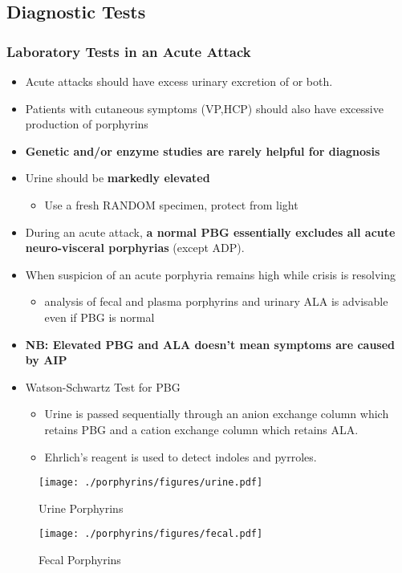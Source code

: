 \documentclass{scrartcl}
\begin{document}
\subsection{Diagnostic Tests}
\label{sec:orgac00301}
\subsubsection{Laboratory Tests in an Acute Attack}
\label{sec:org55f100f}
\begin{itemize}
\item Acute attacks should have excess urinary excretion of or both.
\item Patients with cutaneous symptoms (VP,HCP) should also have excessive
production of porphyrins
\item \textbf{Genetic and/or enzyme studies are rarely helpful for diagnosis}
\item Urine should be \textbf{markedly elevated}
\begin{itemize}
\item Use a fresh RANDOM specimen, protect from light
\end{itemize}
\item During an acute attack, \textbf{a normal PBG essentially excludes all acute
neuro-visceral porphyrias} (except ADP).
\item When suspicion of an acute porphyria remains high while crisis is
resolving
\begin{itemize}
\item analysis of fecal and plasma porphyrins and urinary ALA is
advisable even if PBG is normal
\end{itemize}
\item \textbf{NB: Elevated PBG and ALA doesn't mean symptoms are caused by AIP}
\item Watson-Schwartz Test for PBG
\begin{itemize}
\item Urine is passed sequentially through an anion exchange column which
retains PBG and a cation exchange column which retains ALA.
\item Ehrlich's reagent is used to detect indoles and pyrroles.
\end{itemize}
\end{itemize}

\begin{figure}[htbp]
\centering
\texttt{[image: ./porphyrins/figures/urine.pdf]}
\caption{\label{fig:org61811f8}
Urine Porphyrins}
\end{figure}

\begin{figure}[htbp]
\centering
\texttt{[image: ./porphyrins/figures/fecal.pdf]}
\caption{\label{fig:orgcd350b3}
Fecal Porphyrins}
\end{figure}
\end{document}
